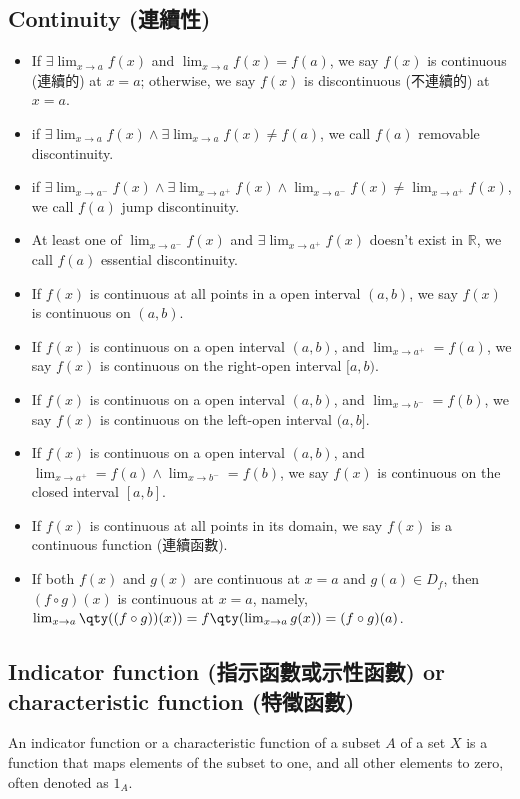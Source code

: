 \documentclass[a4paper,12pt]{report}
\begin{document}
\subsection{Continuity (連續性)}
\begin{itemize}
\item If $\exists \lim_{x\to a} f(x)$ and $\lim_{x\to a} f(x)=f(a)$, we say $f(x)$ is continuous (連續的) at $x=a$; otherwise, we say $f(x)$ is discontinuous (不連續的) at $x=a$.
\item if $\exists\lim_{x\to a}f(x)\land\exists\lim_{x\to a}f(x)\neq f(a)$, we call $f(a)$ removable discontinuity.
\item if $\exists\lim_{x\to a^-}f(x)\land\exists\lim_{x\to a^+}f(x)\land\lim_{x\to a^-}f(x)\neq\lim_{x\to a^+}f(x)$, we call $f(a)$ jump discontinuity.
\item At least one of $\lim_{x\to a^-}f(x)$ and $\exists\lim_{x\to a^+}f(x)$ doesn't exist in $\mathbb{R}$, we call $f(a)$ essential discontinuity.
\item If $f(x)$ is continuous at all points in a open interval $(a,b)$, we say $f(x)$ is continuous on $(a,b)$.
\item If $f(x)$ is continuous on a open interval $(a,b)$, and $\lim_{x\to a^+}=f(a)$, we say $f(x)$ is continuous on the right-open interval $[a,b)$.
\item If $f(x)$ is continuous on a open interval $(a,b)$, and $\lim_{x\to b^-}=f(b)$, we say $f(x)$ is continuous on the left-open interval $(a,b]$.
\item If $f(x)$ is continuous on a open interval $(a,b)$, and $\lim_{x\to a^+}=f(a)\land\lim_{x\to b^-}=f(b)$, we say $f(x)$ is continuous on the closed interval $[a,b]$.
\item If $f(x)$ is continuous at all points in its domain, we say $f(x)$ is a continuous function (連續函數).
\item If both $f(x)$ and $g(x)$ are continuous at $x=a$ and $g(a)\in D_f$, then $(f\circ g)(x)$ is continuous at $x=a$, namely, $\lim_{x\to a}\qty((f\circ g))(x))=f\qty(\lim_{x\to a} g(x))=(f\circ g)(a)$.
\end{itemize}
\subsection{Indicator function (指示函數或示性函數) or characteristic function (特徵函數)}
An indicator function or a characteristic function of a subset $A$ of a set $X$ is a function that maps elements of the subset to one, and all other elements to zero, often denoted as $1_A$.
\end{document}
